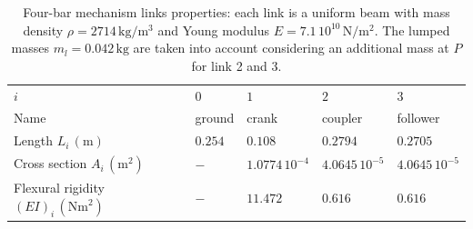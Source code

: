 \documentclass{svjour3}                     %
\begin{document}
\begin{table}[bt]
	\caption{Four-bar mechanism links properties: each link is a uniform beam with mass density $\rho=2714\,\mathrm{kg}/\mathrm{m}^3$ and Young modulus $E=7.1\,10^{10}\,\mathrm{N}/\mathrm{m}^2$. The lumped masses $m_l=0.042\,\mathrm{kg}$ are taken into account considering an additional mass at $P$ for link 2 and 3.}
	\label{tab:data_4bars}       %
	\begin{tabular}{lllll}
		\hline\noalign{\smallskip}
		$i$ & $0$ &  $1$ &  $2$ &  $3$  \\
		\noalign{\smallskip}\hline\noalign{\smallskip}
		Name & ground & crank & coupler & follower \\ 
		Length $L_i\,(\mathrm{m})$ & $0.254$ & $0.108$ & $0.2794$ & $0.2705$\\
		Cross section $A_i\,(\mathrm{m}^2)$ & $-$ & $1.0774\,10^{-4}$ & $4.0645\,10^{-5}$ & $4.0645\,10^{-5}$ \\
		Flexural rigidity $(EI)_i\,(\mathrm{Nm}^2)$ & $-$ & $11.472$ & $0.616$ & $0.616$ \\
		\hline
	\end{tabular}
\end{table}
\end{document}

